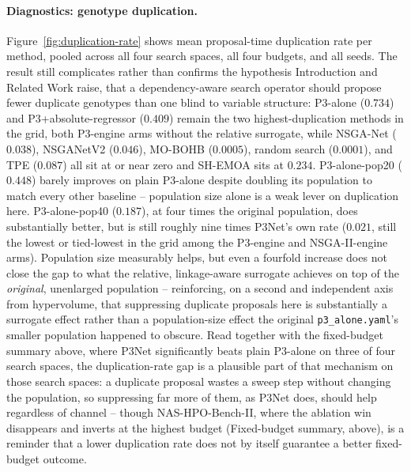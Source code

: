 \paragraph{Diagnostics: genotype duplication.} Figure~\ref{fig:duplication-rate} shows mean proposal-time
duplication rate per method, pooled across all four search spaces, all four budgets, and all seeds. The
result still complicates rather than confirms the hypothesis Introduction and Related Work raise, that a
dependency-aware search operator should propose fewer duplicate genotypes than one blind to variable
structure: P3-alone ($0.734$) and P3+absolute-regressor ($0.409$) remain the two highest-duplication methods
in the grid, both P3-engine arms without the relative surrogate, while NSGA-Net ($0.038$), NSGANetV2
($0.046$), MO-BOHB ($0.0005$), random search ($0.0001$), and TPE ($0.087$) all sit at or near zero and
SH-EMOA sits at $0.234$. P3-alone-pop20 ($0.448$) barely improves on plain P3-alone despite doubling its
population to match every other baseline -- population size alone is a weak lever on duplication here.
P3-alone-pop40 ($0.187$), at four times the original population, does substantially better, but is still
roughly nine times P3Net's own rate ($0.021$, still the lowest or tied-lowest in the grid among the
P3-engine and NSGA-II-engine arms). Population size measurably helps, but even a fourfold increase does not
close the gap to what the relative, linkage-aware surrogate achieves on top of the \emph{original},
unenlarged population -- reinforcing, on a second and independent axis from hypervolume, that suppressing
duplicate proposals here is substantially a surrogate effect rather than a population-size effect the
original \texttt{p3\_alone.yaml}'s smaller population happened to obscure. Read together with the
fixed-budget summary above, where P3Net significantly beats plain P3-alone on three of four search spaces,
the duplication-rate gap is a plausible part of that mechanism on those search spaces: a duplicate proposal
wastes a sweep step without changing the population, so suppressing far more of them, as P3Net does, should
help regardless of channel -- though NAS-HPO-Bench-II, where the ablation win disappears and inverts at the
highest budget (Fixed-budget summary, above), is a reminder that a lower duplication rate does not by itself
guarantee a better fixed-budget outcome.

